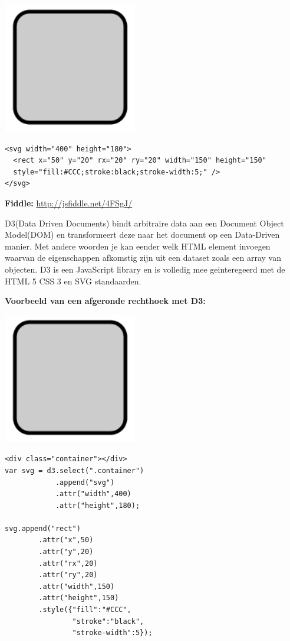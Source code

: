 \begin{center}
  \includegraphics[]{figures/chap2/SVGrectangle.png}
\end{center}

\begin{lstlisting}
<svg width="400" height="180">
  <rect x="50" y="20" rx="20" ry="20" width="150" height="150"
  style="fill:#CCC;stroke:black;stroke-width:5;" />
</svg>
\end{lstlisting}

\textbf{Fiddle: }\url{http://jsfiddle.net/4FSgJ/}

D3(Data Driven Documents) bindt arbitraire data aan een Document Object Model(DOM) en transformeert deze naar het document op een Data-Driven manier. Met andere woorden je kan eender welk HTML element invoegen waarvan de eigenschappen afkomstig zijn uit een dataset zoals een array van objecten. D3 is een JavaScript library en is volledig mee geinteregeerd met de HTML 5 CSS 3 en SVG standaarden.

\textbf{Voorbeeld van een afgeronde rechthoek met D3:}

\begin{center}
  \includegraphics[]{figures/chap2/SVGrectangle.png}
\end{center}

\begin{lstlisting}
<div class="container"></div>
var svg = d3.select(".container")
            .append("svg")
            .attr("width",400)
            .attr("height",180);

svg.append("rect")
        .attr("x",50)
        .attr("y",20)
        .attr("rx",20)
        .attr("ry",20)
        .attr("width",150)
        .attr("height",150)
        .style({"fill":"#CCC",
                "stroke":"black",
                "stroke-width":5});
\end{lstlisting}

